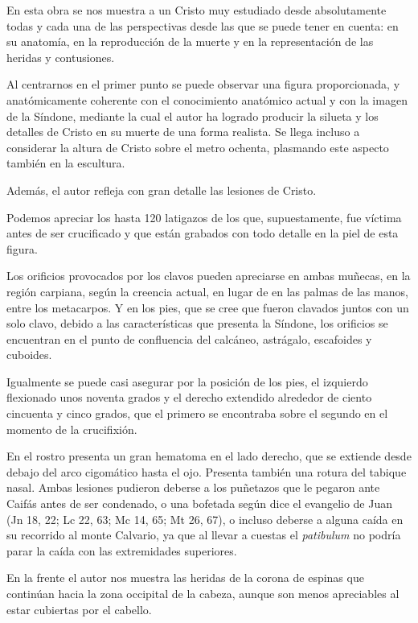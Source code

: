 En esta obra se nos muestra a un Cristo muy estudiado desde absolutamente todas y cada una de las perspectivas desde las que se puede tener en cuenta: en su anatomía, en la reproducción de la muerte y en la representación de las heridas y contusiones.

Al centrarnos en el primer punto se puede observar una figura proporcionada, y anatómicamente coherente con el conocimiento anatómico actual y con la imagen de la Síndone, mediante la cual el autor ha logrado producir la silueta y los detalles de Cristo en su muerte de una forma realista. Se llega incluso a considerar la altura de Cristo sobre el metro ochenta, plasmando este aspecto también en la escultura.

Además, el autor refleja con gran detalle las lesiones de Cristo.

Podemos apreciar los hasta 120 latigazos de los que, supuestamente, fue víctima antes de ser crucificado y que están grabados con todo detalle en la piel de esta figura.

Los orificios provocados por los clavos pueden apreciarse en ambas muñecas, en la región carpiana, según la creencia actual, en lugar de en las palmas de las manos, entre los metacarpos. Y en los pies, que se cree que fueron clavados juntos con un solo clavo, debido a las características que presenta la Síndone, los orificios se encuentran en el punto de confluencia del calcáneo, astrágalo, escafoides y cuboides.

Igualmente se puede casi asegurar por la posición de los pies, el izquierdo flexionado unos noventa grados y el derecho extendido alrededor de ciento cincuenta y cinco grados, que el primero se encontraba sobre el segundo en el momento de la crucifixión.

En el rostro presenta un gran hematoma en el lado derecho, que se extiende desde debajo del arco cigomático hasta el ojo. Presenta también una rotura del tabique nasal. Ambas lesiones pudieron deberse a los puñetazos que le pegaron ante Caifás antes de ser condenado, o una bofetada según dice el evangelio de Juan (Jn 18, 22; Lc 22, 63; Mc 14, 65; Mt 26, 67), o incluso deberse a alguna caída en su recorrido al monte Calvario, ya que al llevar a cuestas el \textit{patibulum} no podría parar la caída con las extremidades superiores.

En la frente el autor nos muestra las heridas de la corona de espinas que continúan hacia la zona occipital de la cabeza, aunque son menos apreciables al estar cubiertas por el cabello.

